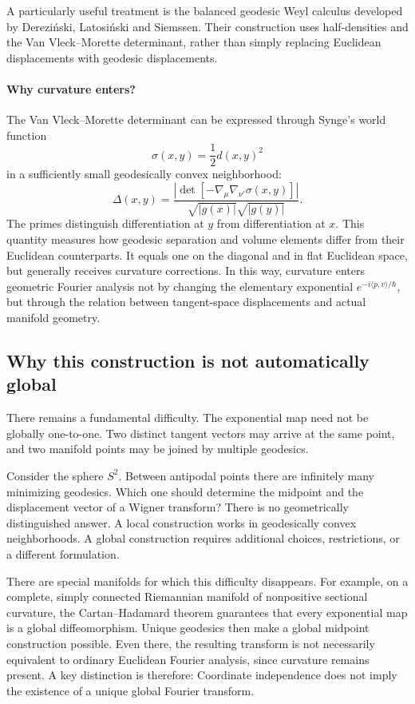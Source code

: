A particularly useful treatment is the balanced geodesic Weyl calculus
developed by Dereziński, Latosiński and Siemssen. Their construction uses
half-densities and the Van Vleck–Morette determinant, rather than simply
replacing Euclidean displacements with geodesic displacements. 

\paragraph{Why curvature enters?}
The Van Vleck–Morette determinant can be expressed through Synge's world function
\[
\sigma(x,y)=\frac12 d(x,y)^2
\]
in a sufficiently small geodesically convex neighborhood:
\[
\Delta(x,y)=
\frac{
\left|\det[-\nabla_\mu\nabla_{\nu'}\sigma(x,y)]\right|
}{
\sqrt{|g(x)|}\sqrt{|g(y)|}
}.
\]
The primes distinguish differentiation at \(y\) from differentiation at \(x\).
This quantity measures how geodesic separation and volume elements differ from
their Euclidean counterparts. It equals one on the diagonal and in flat
Euclidean space, but generally receives curvature corrections.
In this way, curvature enters geometric Fourier analysis not by changing the
elementary exponential \(e^{-i\langle p,v\rangle/\hbar}\), but through the
relation between tangent-space displacements and actual manifold geometry.

\subsection{Why this construction is not automatically global}
There remains a fundamental difficulty.
The exponential map need not be globally one-to-one. Two distinct tangent
vectors may arrive at the same point, and two manifold points may be joined by
multiple geodesics.

Consider the sphere \(S^2\). Between antipodal points there are infinitely many
minimizing geodesics. Which one should determine the midpoint and the
displacement vector of a Wigner transform?
There is no geometrically distinguished answer.
A local construction works in geodesically convex neighborhoods. A global
construction requires additional choices, restrictions, or a different
formulation.

There are special manifolds for which this difficulty disappears. For example,
on a complete, simply connected Riemannian manifold of nonpositive sectional
curvature, the Cartan–Hadamard theorem guarantees that every exponential map is
a global diffeomorphism. Unique geodesics then make a global midpoint
construction possible.
Even there, the resulting transform is not necessarily equivalent to ordinary
Euclidean Fourier analysis, since curvature remains present.
A key distinction is therefore:
Coordinate independence does not imply the existence of a unique global Fourier
transform.

